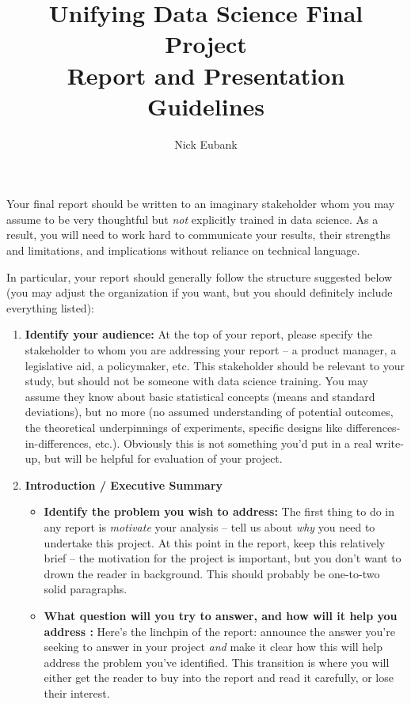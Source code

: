 \documentclass[12pt]{article}
\title{Unifying Data Science Final Project \\ Report and Presentation Guidelines}
\author{Nick Eubank}
\begin{document}
\maketitle

Your final report should be written to an imaginary stakeholder whom you may assume to be very thoughtful but \emph{not} explicitly trained in data science. As a result, you will need to work hard to communicate your results, their strengths and limitations, and implications without reliance on technical language. 

In particular, your report should generally follow the structure suggested below (you may adjust the organization if you want, but you should definitely include everything listed): 

\begin{enumerate}
    \item \textbf{Identify your audience:}  At the top of your report, please specify the stakeholder to whom you are addressing your report -- a product manager, a legislative aid, a policymaker, etc. This stakeholder should be relevant to your study, but should not be someone with data science training. You may assume they know about basic statistical concepts (means and standard deviations), but no more (no assumed understanding of potential outcomes, the theoretical underpinnings of experiments, specific designs like differences-in-differences, etc.). Obviously this is not something you'd put in a real write-up, but will be helpful for evaluation of your project. 
    \item \textbf{Introduction / Executive Summary}
    \begin{itemize}
        \item \textbf{Identify the problem you wish to address:} The first thing to do in any report is \emph{motivate} your analysis -- tell us about \emph{why} you need to undertake this project. At this point in the report, keep this relatively brief -- the motivation for the project is important, but you don't want to drown the reader in background. This should probably be one-to-two solid paragraphs.  
        \item \textbf{What question will you try to answer, and how will it help you address :} Here's the linchpin of the report: announce the answer you're seeking to answer in your project \emph{and} make it clear how this will help address the problem you've identified. This transition is where you will either get the reader to buy into the report and read it carefully, or lose their interest. 

\end{itemize}
\end{enumerate}
\end{document}
